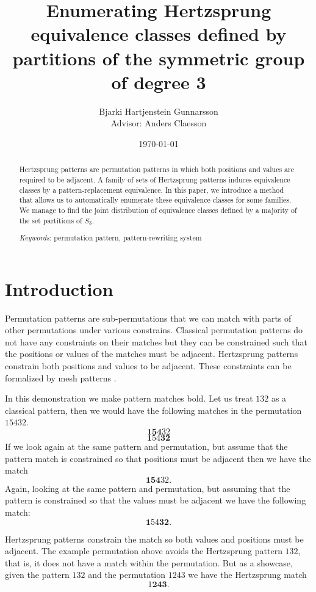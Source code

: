 \documentclass[a4paper, 11pt, english]{article}
\newcommand{\breath}{\vspace{6pt plus 2pt minus 1pt}\noindent}
\theoremstyle{definition}
\newcommand{\Sym}{S}
\begin{document}
\title{Enumerating Hertzsprung equivalence classes defined by partitions of the symmetric group of degree 3}
\author{Bjarki Hartjenstein Gunnarsson \\[0.6cm]{\small Advisor: Anders Claesson}}
\date{\today}
\maketitle

\begin{abstract}
    Hertzsprung patterns are permutation patterns in which both positions and values are required to
    be adjacent. A family of sets of Hertzsprung patterns induces equivalence classes by
    a pattern-replacement equivalence. In this paper, we introduce a method that allows us 
    to automatically enumerate these equivalence classes for some families. We manage to find the joint
    distribution of equivalence classes defined by a majority of the set partitions of $\Sym_3$.

    \breath \emph{Keywords}: permutation pattern, pattern-rewriting system
\end{abstract}

\section{Introduction}
Permutation patterns are sub-permutations that we can match with parts of other
permutations under various constrains. 
Classical permutation patterns do not have any constraints on their matches but they can
be constrained such that the positions or values of the matches must be adjacent.
Hertzsprung patterns constrain both positions and values to be adjacent. 
These constraints can be formalized by mesh patterns \cite{claesson:2011}.

In this demonstration we make pattern matches bold.  Let us treat $132$ as a classical
pattern, then we would have the following matches in the permutation $15432$.
\[
    \bm{154}32
\]
\[
    \bm{1}54\bm{32}
\]
If we look again at the same pattern and permutation, but assume that the
pattern match is constrained so that positions must be adjacent then we have the match
\[
    \bm{154}32.
\]
Again, looking at the same pattern and permutation, but assuming that the
pattern is constrained so that the values must be adjacent we have the following
match:
\[
    \bm{1}54\bm{32}.
\]

Hertzsprung patterns constrain the match so both values and positions must be
adjacent. The example permutation above avoids the Hertzsprung pattern $132$, that is, it does not have a match
within the permutation. But as a showcase, given the pattern $132$ and the permutation $1243$ we
have the Hertzsprung match
\[
    1\bm{243}.
\]
\end{document}
